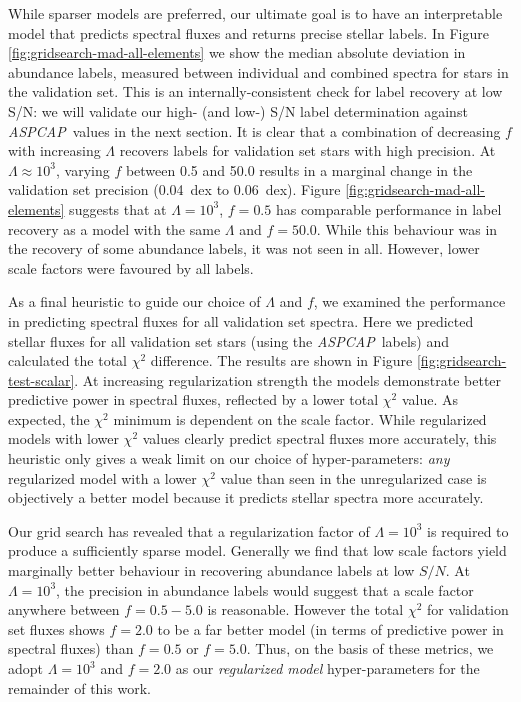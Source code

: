 \documentclass[12pt,preprint]{aastex}
\newcommand{\project}[1]{\textsl{#1}}
\newcommand{\acronym}[1]{{\small{#1}}}
\newcommand{\aspcap}{\project{\acronym{ASPCAP}}}
\begin{document}
While sparser models are preferred, our ultimate goal is to have an 
interpretable model that predicts spectral fluxes and returns precise stellar
labels.  In Figure \ref{fig:gridsearch-mad-all-elements} we show the median
absolute deviation in abundance labels, measured between individual and combined
spectra for stars in the validation set.  This is an internally-consistent
check for label recovery at low S/N: we will validate our high- (and low-) S/N
label determination against \aspcap\ values in the next section.  It is
clear that a combination of decreasing $f$ with increasing $\Lambda$ recovers
labels for validation set stars with high precision.  At $\Lambda \approx 10^3$,
varying $f$ between 0.5 and 50.0 results in a marginal change in the validation
set precision (0.04~dex to 0.06~dex).  Figure \ref{fig:gridsearch-mad-all-elements}
suggests that at $\Lambda = 10^3$, $f = 0.5$ has comparable performance in
label recovery as a model with the same $\Lambda$ and $f = 50.0$.  While this
behaviour was in the recovery of some abundance labels, it was not seen in all.
However, lower scale factors were favoured by all labels.


As a final heuristic to guide our choice of $\Lambda$ and $f$, we examined the
performance in predicting spectral fluxes for all validation set spectra.  Here 
we predicted stellar fluxes for all validation set stars (using the \aspcap\ 
labels) and calculated the total $\chi^2$ difference.  The results are shown in
Figure \ref{fig:gridsearch-test-scalar}.  At increasing regularization strength
the models demonstrate better predictive power in spectral fluxes, reflected by
a lower total $\chi^2$ value.  As expected, the $\chi^2$ minimum is dependent on
the scale factor.  While regularized models with lower $\chi^2$ values clearly
predict spectral fluxes more accurately, this heuristic only gives a weak limit
on our choice of hyper-parameters: \emph{any} regularized model with a lower
$\chi^2$ value than seen in the unregularized case is objectively a better model 
because it predicts stellar spectra more accurately.


Our grid search has revealed that a regularization factor of $\Lambda = 10^3$ is
required to produce a sufficiently sparse model.  Generally we find that low
scale factors yield marginally better behaviour in recovering abundance labels
at low $S/N$.  At $\Lambda = 10^3$, the precision in abundance labels would 
suggest that a scale factor anywhere between $f = 0.5-5.0$ is reasonable. 
However the total $\chi^2$ for validation set fluxes shows $f = 2.0$ to be a far
better model (in terms of predictive power in spectral fluxes) than $f = 0.5$
or $f = 5.0$.  Thus, on the basis of these metrics, we adopt $\Lambda = 10^3$
and $f = 2.0$ as our \emph{regularized model} hyper-parameters for the
remainder of this work.
\end{document}

